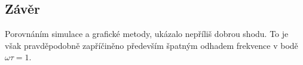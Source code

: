 \documentclass{article}
\begin{document}
\subsection*{Závěr}
Porovnáním simulace a grafické metody, ukázalo nepříliš dobrou shodu.
To je však pravděpodobně zapříčiněno především špatným odhadem frekvence v bodě \(\omega \tau = 1\).
\end{document}
